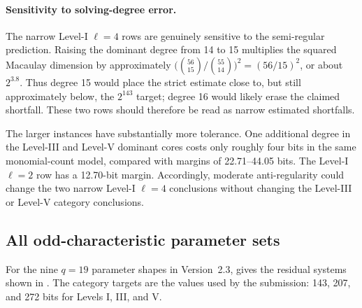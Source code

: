 \documentclass[11pt]{article}
\begin{document}
\paragraph{Sensitivity to solving-degree error.}
The narrow Level-I $\ell=4$ rows are genuinely sensitive to the semi-regular
prediction.  Raising the dominant degree from 14 to 15 multiplies the squared
Macaulay dimension by approximately $\bigl(\binom{56}{15}/\binom{55}{14}\bigr)^2
=(56/15)^2$, or about $2^{3.8}$.  Thus degree 15 would place the strict estimate
close to, but still approximately below, the $2^{143}$ target; degree 16 would
likely erase the claimed shortfall.  These two rows should therefore be read as
narrow estimated shortfalls.

The larger instances have substantially more tolerance.  One additional degree
in the Level-III and Level-V dominant cores costs only roughly four bits in the
same monomial-count model, compared with margins of 22.71--44.05 bits.  The
Level-I $\ell=2$ row has a 12.70-bit margin.  Accordingly, moderate
anti-regularity could change the two narrow Level-I $\ell=4$ conclusions without
changing the Level-III or Level-V category conclusions.

\subsection{All odd-characteristic parameter sets}

For the nine $q=19$ parameter shapes in Version~2.3,  gives the residual systems shown in .  The category targets are the values used by the submission: 143, 207, and 272 bits for Levels I, III, and V.
\end{document}
